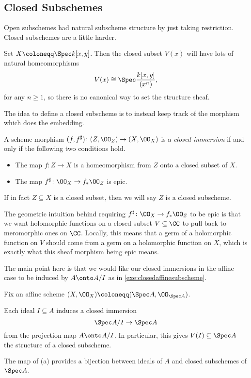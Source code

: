 \documentclass[../notes.tex]{subfiles}
\begin{document}
\subsection{Closed Subschemes}
Open subschemes had natural subscheme structure by just taking restriction. Closed subschemes are a little harder.
\begin{example}
	Set $X\coloneqq\Spec k[x,y]$. Then the closed subset $V(x)$ will have lots of natural homeomorphisms
	\[V(x)\cong\Spec\frac{k[x,y]}{(x^n)},\]
	for any $n\ge1$, so there is no canonical way to set the structure sheaf.
\end{example}
The idea to define a closed subscheme is to instead keep track of the morphism which does the embedding.
\begin{definition}
	A scheme morphism $(f,f^\sharp)\colon(Z,\OO_Z)\to(X,\OO_X)$ is a \textit{closed immersion} if and only if the following two conditions hold.
	\begin{itemize}
		\item The map $f\colon Z\to X$ is a homeomorphism from $Z$ onto a closed subset of $X$.
		\item The map $f^\sharp\colon\OO_X\to f_*\OO_Z$ is epic.
	\end{itemize}
	If in fact $Z\subseteq X$ is a closed subset, then we will say $Z$ is a closed subscheme.
\end{definition}
\begin{remark}
	The geometric intuition behind requiring $f^\sharp\colon\OO_X\to f_*\OO_Z$ to be epic is that we want holomorphic functions on a closed subset $V\subseteq\CC$ to pull back to meromorphic ones on $\CC$. Locally, this means that a germ of a holomorphic function on $V$ should come from a germ on a holomorphic function on $X$, which is exactly what this sheaf morphism being epic means.
\end{remark}
The main point here is that we would like our closed immersions in the affine case to be induced by $A\onto A/I$ as in \autoref{exe:closedaffinesubscheme}.
\begin{proposition} \label{prop:affineclosedsubschemes}
	Fix an affine scheme $(X,\OO_X)\coloneqq(\Spec A,\OO_{\Spec A})$.
	\begin{listalph}
		\item Each ideal $I\subseteq A$ induces a closed immersion
		\[\Spec A/I\to\Spec A\]
		from the projection map $A\onto A/I$. In particular, this gives $V(I)\subseteq\Spec A$ the structure of a closed subscheme.
		\item The map of (a) provides a bijection between ideals of $A$ and closed subschemes of $\Spec A$.
	\end{listalph}
\end{proposition}
\end{document}

